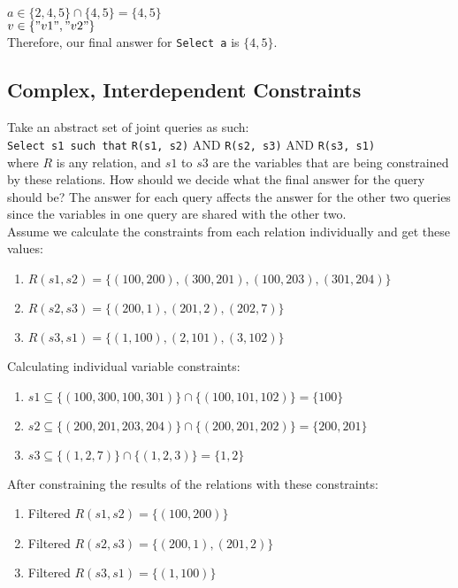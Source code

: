 \documentclass{article}
\begin{document}
$a \in  \{2, 4, 5\} \cap  \{4, 5\}  = \{4, 5\}$ \\
$v \in \{"v1", "v2"\}$\\

Therefore, our final answer for \texttt{Select a} is $\{4, 5\}$. 

\subsection{Complex, Interdependent Constraints}
Take an abstract set of joint queries as such: \\

\verb|Select s1 such that| \verb|R(s1, s2)| AND \verb|R(s2, s3)| AND \verb|R(s3, s1)| \\

where $R$ is any relation, and $s1$ to $s3$ are the variables that are being constrained by these relations. How should we  decide what the final answer for the query should be? The answer for each query affects the answer for the other two queries since the variables in one query are shared with the other two. \\

Assume we calculate the constraints from each relation individually and get these values: 

\begin{enumerate}
    \item $R(s1, s2) = \{(100, 200), (300, 201), (100, 203), (301, 204)\}$
    \item $R(s2, s3) = \{(200, 1), (201, 2), (202, 7)\}$
    \item $R(s3, s1) = \{(1, 100), (2, 101), (3, 102)\}$
\end{enumerate}

Calculating individual variable constraints: 

\begin{enumerate}
    \item $s1 \subseteq \{(100, 300, 100, 301)\} \cap \{(100, 101, 102)\}  = \{100\}$
    \item $s2 \subseteq \{(200, 201, 203, 204)\} \cap \{(200, 201, 202)\}  = \{200, 201\}$
    \item $s3 \subseteq \{(1, 2, 7)\} \cap \{(1, 2, 3)\}  = \{1, 2\}$
\end{enumerate}

After constraining the results of the relations with these constraints:

\begin{enumerate}
    \item Filtered $R(s1, s2) = \{(100, 200)\}$
    \item Filtered $R(s2, s3) = \{(200, 1), (201, 2)\}$
    \item Filtered $R(s3, s1) = \{(1, 100)\}$
\end{enumerate}
\end{document}
